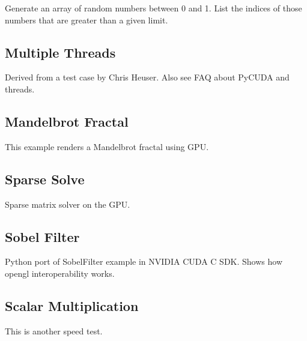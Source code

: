 \documentclass[article,A4,12pt]{llncs}
\begin{document}
Generate an array of random numbers between 0 and 1.
List the indices of those numbers that are greater than a given limit.

\subsection{Multiple Threads}

Derived from a test case by Chris Heuser.
Also see FAQ about PyCUDA and threads.

\subsection{Mandelbrot Fractal}

This example renders a Mandelbrot fractal using GPU.

\subsection{Sparse Solve}

Sparse matrix solver on the GPU.

\subsection{Sobel Filter}

Python port of SobelFilter example in NVIDIA CUDA C SDK. Shows how opengl interoperability works.

\subsection{Scalar Multiplication}

This is another speed test.
\end{document}

